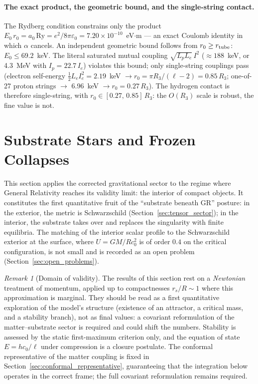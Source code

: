 \documentclass[11pt,a4paper]{article}
\theoremstyle{plain}
\theoremstyle{remark}
\newtheorem*{remarkstar}{Remark}
\begin{document}
\paragraph{The exact product, the geometric bound, and the single-string contact.} The Rydberg condition constrains only the product $E_0\,r_0 = a_0\,\mathrm{Ry} = e^2/8\pi\varepsilon_0 = 7.20\times10^{-10}$~eV$\cdot$m --- an exact Coulomb identity in which $\alpha$ cancels. An independent geometric bound follows from $r_0 \ge r_{\rm tube}$: $E_0 \le 69.2$~keV. The literal saturated mutual coupling $\sqrt{L_pL_e}\,I^2$ ($\approx 188$~keV, or 4.3~MeV with $I_p = 22.7\,I_e$) violates this bound; only single-string couplings pass (electron self-energy $\tfrac{1}{2}L_eI_e^2 = 2.19$~keV $\to r_0 = \pi R_3/(\ell-2) = 0.85\,R_3$; one-of-27 proton strings $\to$ 6.96~keV $\to r_0 = 0.27\,R_3$). The hydrogen contact is therefore single-string, with $r_0 \in [0.27,\,0.85]\,R_3$: the $O(R_3)$ scale is robust, the fine value is not.

\section{Substrate Stars and Frozen Collapses}
\label{sec:substrate_stars}

This section applies the corrected gravitational sector to the regime where General Relativity reaches its validity limit: the interior of compact objects. It constitutes the first quantitative fruit of the ``substrate beneath GR'' posture: in the exterior, the metric is Schwarzschild (Section~\ref{sec:tensor_sector}); in the interior, the substrate takes over and replaces the singularity with finite equilibria. The matching of the interior scalar profile to the Schwarzschild exterior at the surface, where $U = GM/Rc_0^2$ is of order $0.4$ on the critical configuration, is not small and is recorded as an open problem (Section~\ref{sec:open_problems}).

\begin{remarkstar}[Domain of validity]
The results of this section rest on a \emph{Newtonian} treatment of momentum, applied up to compactnesses $r_s/R \sim 1$ where this approximation is marginal. They should be read as a first quantitative exploration of the model's structure (existence of an attractor, a critical mass, and a stability branch), not as final values: a covariant reformulation of the matter--substrate sector is required and could shift the numbers. Stability is assessed by the static first-maximum criterion only, and the equation of state $E = hc_0/\ell$ under compression is a closure postulate. The conformal representative of the matter coupling is fixed in Section~\ref{sec:conformal_representative}, guaranteeing that the integration below operates in the correct frame; the full covariant reformulation remains required.
\end{remarkstar}
\end{document}

